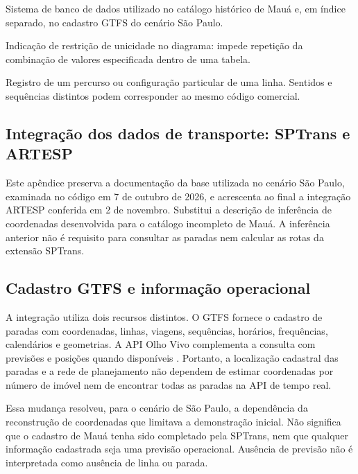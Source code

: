 \documentclass[12pt,oneside,a4paper,brazil,chapter=TITLE]{abntex2}
\let\papsection\section
\renewcommand{\section}{\clearpage\papsection}
\begin{document}
\begin{description}[style=nextline,leftmargin=0pt,labelwidth=0pt,font=\bfseries,itemsep=0.5\baselineskip]
\item[SQLite] Sistema de banco de dados utilizado no catálogo histórico de Mauá e, em índice separado, no cadastro GTFS do cenário São Paulo.
\item[UQ (Unique)] Indicação de restrição de unicidade no diagrama: impede repetição da combinação de valores especificada dentro de uma tabela.
\item[Variante de linha] Registro de um percurso ou configuração particular de uma linha. Sentidos e sequências distintos podem corresponder ao mesmo código comercial.
\end{description}

\begin{apendicesenv}
\chapter{Integração dos dados de transporte: SPTrans e ARTESP}
\label{ap:importacao}
Este apêndice preserva a documentação da base utilizada no cenário São Paulo, examinada no código em 7 de outubro de 2026, e acrescenta ao final a integração ARTESP conferida em 2 de novembro. Substitui a descrição de inferência de coordenadas desenvolvida para o catálogo incompleto de Mauá. A inferência anterior não é requisito para consultar as paradas nem calcular as rotas da extensão SPTrans.

\section{Cadastro GTFS e informação operacional}
A integração utiliza dois recursos distintos. O GTFS fornece o cadastro de paradas com coordenadas, linhas, viagens, sequências, horários, frequências, calendários e geometrias. A API Olho Vivo complementa a consulta com previsões e posições quando disponíveis \citep{gtfs,sptransapi}. Portanto, a localização cadastral das paradas e a rede de planejamento não dependem de estimar coordenadas por número de imóvel nem de encontrar todas as paradas na API de tempo real.

Essa mudança resolveu, para o cenário de São Paulo, a dependência da reconstrução de coordenadas que limitava a demonstração inicial. Não significa que o cadastro de Mauá tenha sido completado pela SPTrans, nem que qualquer informação cadastrada seja uma previsão operacional. Ausência de previsão não é interpretada como ausência de linha ou parada.


\end{apendicesenv}
\end{document}
